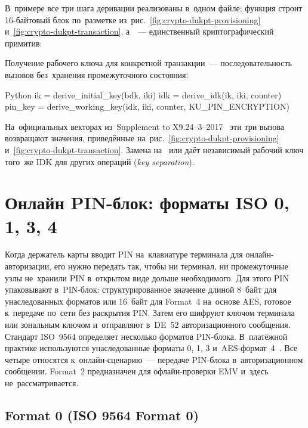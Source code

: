 В~примере все три шага деривации реализованы в~одном файле; функция
 строит 16-байтовый блок по~разметке
из~рис.~\ref{fig:crypto-dukpt-provisioning} и~\ref{fig:crypto-dukpt-transaction}, а~~--- единственный
криптографический примитив:


Получение рабочего ключа для конкретной транзакции~--- последовательность вызовов без~хранения промежуточного состояния:

\begin{codeblock}{Python}
  ik = derive_initial_key(bdk, iki)
  idk = derive_idk(ik, iki, counter)
  pin_key = derive_working_key(idk, iki, counter, KU_PIN_ENCRYPTION)
\end{codeblock}

На~официальных векторах из~Supplement to
X9.24--3--2017~\cite{x9-24-3-test-vectors} эти три вызова возвращают значения,
приведённые на~рис.~\ref{fig:crypto-dukpt-provisioning}
и~\ref{fig:crypto-dukpt-transaction}. Замена
 на~ или
 даёт независимый рабочий ключ того~же IDK для
других операций (\textit{key separation}).

\FloatBarrier
\section{Онлайн PIN-блок: форматы ISO 0, 1, 3, 4}\label{sec:crypto-pin-block}

Когда держатель карты вводит PIN на~клавиатуре терминала для
онлайн-авторизации, его нужно передать так, чтобы ни терминал, ни
промежуточные узлы не~хранили PIN в~открытом виде дольше необходимого. Для
этого PIN упаковывают в~PIN-блок: структурированное значение длиной 8~байт для
унаследованных форматов или 16~байт для Format~4 на~основе AES, готовое
к~передаче по~сети без раскрытия PIN. Затем его шифруют ключом терминала или
зональным ключом и~отправляют в~DE~52 авторизационного сообщения. Стандарт
ISO~9564 определяет несколько форматов PIN-блока. В~платёжной практике
используются унаследованные форматы 0, 1, 3 и~AES-формат~4~\cite{iso-9564}. Все
четыре относятся к~онлайн-сценарию~--- передаче PIN-блока в~авторизационном
сообщении. Format~2 предназначен для офлайн-проверки EMV и~здесь
не~рассматривается.

\subsection*{Format 0 (ISO 9564 Format 0)}


